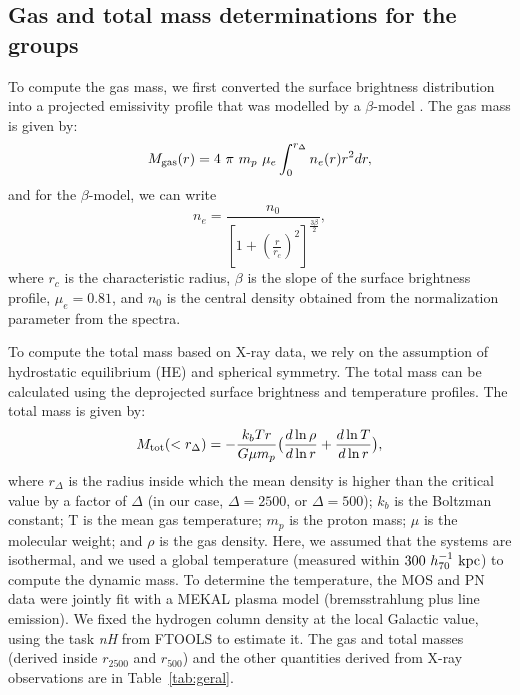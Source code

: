 \documentclass{aa}
\begin{document}
\subsection{Gas and total mass determinations for the groups}
\label{secgas}

To compute the gas mass, we first converted the surface
brightness distribution into a projected emissivity profile that was
modelled by a $\beta$-model \citep{CFF78}.  The gas mass is given by:
\begin{equation}
\label{Mgas}
M_{\rm gas}(r) = 4~\pi~m_{p}~\mu_{e} \int_{0}^{r_{\Delta}} n_{e}(r) r^{2} dr, 
\end{equation}
and for the $\beta$-model, we can write
\begin{equation}
n_{e}=\frac{n_{0}}{[1+(\frac{r}{r_c})^2]^{\frac{3\beta}{2}}},
\end{equation}
where $r_{c}$ is the characteristic radius, $\beta$ is the slope
of the surface brightness profile, $\mu_{e}=0.81$, and $n_{0}$ is the central density
obtained from the normalization parameter from the spectra.

To compute the total mass based on X-ray data, we rely on the
assumption of hydrostatic equilibrium (HE) and spherical symmetry. 
The total mass can be calculated using the deprojected surface brightness
and temperature profiles. The total mass is given by:
\begin{equation}
\label{Mtot}
M_{\rm tot} (< r_{\Delta}) = - \frac{k_{b} T r}{G \mu m_{p}}\big(\frac{d \ln \rho}{d \ln r} + \frac{d \ln T}{d \ln r}\big),
\end{equation}
where $r_{\Delta}$ is the radius inside which the mean density is
higher than the critical value by a factor of $\Delta$ (in our case,
$\Delta = 2500$, or $\Delta=500$); $k_{b}$ is the Boltzman constant; T
is the mean gas temperature; $m_{p}$ is the proton mass; $\mu$ is the
molecular weight; and $\rho$ is the gas density. 
Here, we assumed that the systems are isothermal, and we used a global
temperature (measured within $300~h_{70}^{-1} \rm ~kpc$) to compute
the dynamic mass. To determine the temperature, the MOS and PN data were jointly fit 
with a MEKAL plasma model (bremsstrahlung 
plus line emission). 
We fixed the hydrogen column density at the local Galactic
value, using the task \textit{nH} from FTOOLS \citep[an interpolation from the LAB 
\textit{nH} table,][]{kalberla05} to estimate it.
The gas and total masses (derived inside $r_{2500}$
and $r_{500}$) and the other quantities derived from X-ray
observations are in Table~\ref{tab:geral}.
\end{document}
